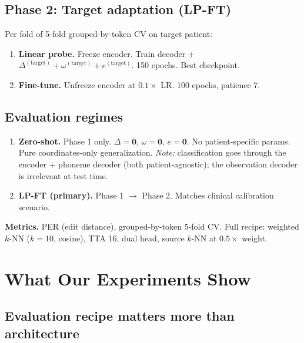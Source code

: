 \documentclass[11pt,letterpaper]{article}
\begin{document}
\subsection{Phase 2: Target adaptation (LP-FT)}

Per fold of 5-fold grouped-by-token CV on target patient:
\begin{enumerate}[leftmargin=2em]
\item \textbf{Linear probe.} Freeze encoder. Train decoder + $\Delta^{(\text{target})} + \omega^{(\text{target})} + e^{(\text{target})}$. 150 epochs. Best checkpoint.
\item \textbf{Fine-tune.} Unfreeze encoder at $0.1\times$ LR. 100 epochs, patience 7.
\end{enumerate}

\subsection{Evaluation regimes}

\begin{enumerate}[leftmargin=2em]
\item \textbf{Zero-shot.} Phase 1 only. $\Delta = \mathbf{0}$, $\omega = \mathbf{0}$, $e = \mathbf{0}$. No patient-specific params. Pure coordinates-only generalization. \textit{Note:} classification goes through the encoder + phoneme decoder (both patient-agnostic); the observation decoder is irrelevant at test time.
\item \textbf{LP-FT (primary).} Phase 1 $\to$ Phase 2. Matches clinical calibration scenario.
\end{enumerate}

\textbf{Metrics.} PER (edit distance), grouped-by-token 5-fold CV. Full recipe: weighted $k$-NN ($k{=}10$, cosine), TTA 16, dual head, source $k$-NN at $0.5\times$ weight.



\section{What Our Experiments Show}\label{sec:experiments}

\subsection{Evaluation recipe matters more than architecture}
\end{document}
